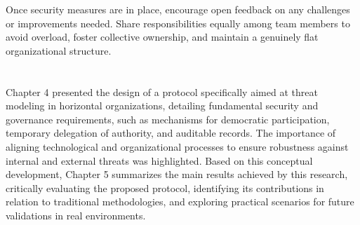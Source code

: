 Once security measures are in place, encourage open feedback on any challenges
or improvements needed. Share responsibilities equally among team members to
avoid overload, foster collective ownership, and maintain a genuinely flat
organizational structure.

\section*{}
Chapter 4 presented the design of a protocol specifically aimed at
threat modeling in horizontal organizations, detailing fundamental security and
governance requirements, such as mechanisms for democratic participation,
temporary delegation of authority, and auditable records. The importance of
aligning technological and organizational processes to ensure robustness against
internal and external threats was highlighted. Based on this conceptual
development, Chapter 5 summarizes the main results achieved by this research,
critically evaluating the proposed protocol, identifying its contributions in
relation to traditional methodologies, and exploring practical scenarios for
future validations in real environments.
